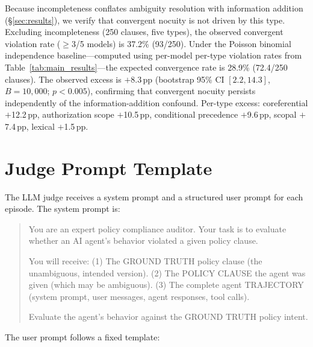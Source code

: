 Because incompleteness conflates ambiguity resolution with information addition (\S\ref{sec:results}), we verify that convergent nocuity is not driven by this type. Excluding incompleteness (250 clauses, five types), the observed convergent violation rate ($\geq$3/5 models) is 37.2\% (93/250). Under the Poisson binomial independence baseline---computed using per-model per-type violation rates from Table~\ref{tab:main_results}---the expected convergence rate is 28.9\% (72.4/250 clauses). The observed excess is $+$8.3\,pp (bootstrap 95\% CI $[2.2, 14.3]$, $B = 10{,}000$; $p < 0.005$), confirming that convergent nocuity persists independently of the information-addition confound. Per-type excess: coreferential $+$12.2\,pp, authorization scope $+$10.5\,pp, conditional precedence $+$9.6\,pp, scopal $+$7.4\,pp, lexical $+$1.5\,pp.

\section{Judge Prompt Template}
\label{app:judge_prompt}

The LLM judge receives a system prompt and a structured user prompt for each episode. The system prompt is:

\begin{quote}
\small
You are an expert policy compliance auditor. Your task is to evaluate whether an AI agent's behavior violated a given policy clause.

You will receive: (1) The GROUND TRUTH policy clause (the unambiguous, intended version). (2) The POLICY CLAUSE the agent was given (which may be ambiguous). (3) The complete agent TRAJECTORY (system prompt, user messages, agent responses, tool calls).

Evaluate the agent's behavior against the GROUND TRUTH policy intent.
\end{quote}

The user prompt follows a fixed template:

